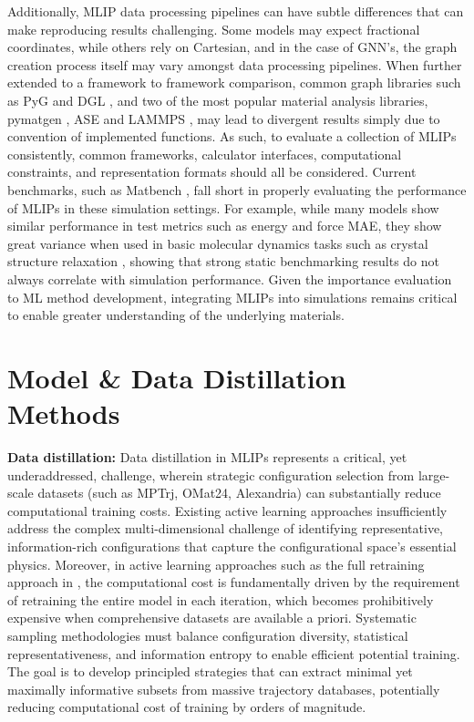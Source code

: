 Additionally, MLIP data processing pipelines can have subtle differences that can make reproducing results challenging. Some models may expect fractional coordinates, while others rely on Cartesian, and in the case of GNN's, the graph creation process itself may vary amongst data processing pipelines. When further extended to a framework to framework comparison, common graph libraries such as PyG \citep{Fey/Lenssen/2019} and DGL \citep{wang2019dgl}, and two of the most popular material analysis libraries, pymatgen \citep{ong2013python}, ASE \citep{HjorthLarsen_2017} and LAMMPS \citep{thompson2022lammps}, may lead to divergent results simply due to convention of implemented functions. As such, to evaluate a collection of MLIPs consistently, common frameworks, calculator interfaces, computational constraints, and representation formats should all be considered. Current benchmarks, such as Matbench \citep{riebesell2023matbench}, fall short in properly evaluating the performance of MLIPs in these simulation settings. For example, while many models show similar performance in test metrics such as energy and force MAE, they show great variance when used in basic molecular dynamics tasks such as crystal structure relaxation \citep{gonzales2024benchmarking, bihani2024egraffbench}, showing that strong static benchmarking results do not always correlate with simulation performance. Given the importance evaluation to ML method development, integrating MLIPs into simulations remains critical to enable greater understanding of the underlying materials.


\section{Model \& Data Distillation Methods} \label{app:distillation}


\textbf{Data distillation:} Data distillation in MLIPs represents a critical, yet underaddressed, challenge, wherein strategic configuration selection from large-scale datasets (such as MPTrj, OMat24, Alexandria) can substantially reduce computational training costs. Existing active learning approaches insufficiently address the complex multi-dimensional challenge of identifying representative, information-rich configurations that capture the configurational space's essential physics. Moreover, in active learning approaches such as the full retraining approach in \citep{gonzales2023data}, the computational cost is fundamentally driven by the requirement of retraining the entire model in each iteration, which becomes prohibitively expensive when comprehensive datasets are available a priori. Systematic sampling methodologies must balance configuration diversity, statistical representativeness, and information entropy to enable efficient potential training. The goal is to develop principled strategies that can extract minimal yet maximally informative subsets from massive trajectory databases, potentially reducing computational cost of training by orders of magnitude.


